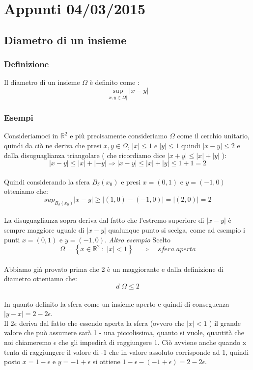 \documentclass[fontsize = 20px, paper = a4]{article}
\begin{document}
\section{Appunti 04/03/2015}
\subsection{Diametro di un insieme}
\subsubsection{Definizione}
Il diametro di un insieme $\Omega$ è definito come :
$$\sup_{x,y \in \Omega|}|x-y|$$
\subsubsection{Esempi}
Consideriamoci in $\mathbb{R}^2$ e più precisamente consideriamo $\Omega$ come il cerchio unitario, quindi da ciò ne deriva che presi $x,y \in \Omega$, $|x| \le 1 \; e \; |y| \le 1$ quindi $ | x - y | \le 2$ e dalla disuguaglianza triangolare ( che ricordiamo dice $|x+y| \le |x| + |y|$ ): 
$$|x-y| \le |x| + |-y| \Longrightarrow |x-y| \le |x| + |y| \le 1 +1 = 2$$  \\ 
Quindi considerando la sfera $B_\delta(x_0)$ e presi $x = (0,1)$ e $y=(-1,0)$ otteniamo che:
$$sup_{B_\delta(x_0)} |x-y| \ge |(1,0) - (-1,0)| = |(2,0)| = 2$$ \\ 
La disuguaglianza sopra deriva dal fatto che l'estremo superiore di $|x-y|$ è sempre maggiore uguale di $|x-y|$ qualunque punto si scelga, come ad esempio i punti $x = (0,1)$ e $y = (-1,0)$.
\emph{Altro esempio}
Scelto \\
$$\Omega = \left \{ x\in \mathbb{R}^2 \; : \; |x| < 1 \right \} \quad \Longrightarrow \quad sfera \; aperta $$ \\
Abbiamo già provato prima che 2 è un maggiorante e dalla definizione di diametro otteniamo che:
$$d\;\Omega \le 2$$ \\
In quanto definito la sfera come un insieme aperto e quindi di conseguenza $|y - x| = 2 -2\epsilon$. \\
Il $2\epsilon$ deriva dal fatto che essendo aperta la sfera  (ovvero che $|x| < 1$ ) il grande valore che può assumere sarà 1 - una piccolissima, quanto si vuole, quantità che noi chiameremo $\epsilon$ che gli impedirà di raggiungere 1. Ciò avviene anche quando x tenta di raggiungere il valore di -1 che in valore assoluto corrisponde ad 1, quindi posto $x = 1-\epsilon$ e $y = -1 + \epsilon$ si ottiene $1 - \epsilon - (-1 + \epsilon) = 2 - 2\epsilon$. \\ 
\end{document}
